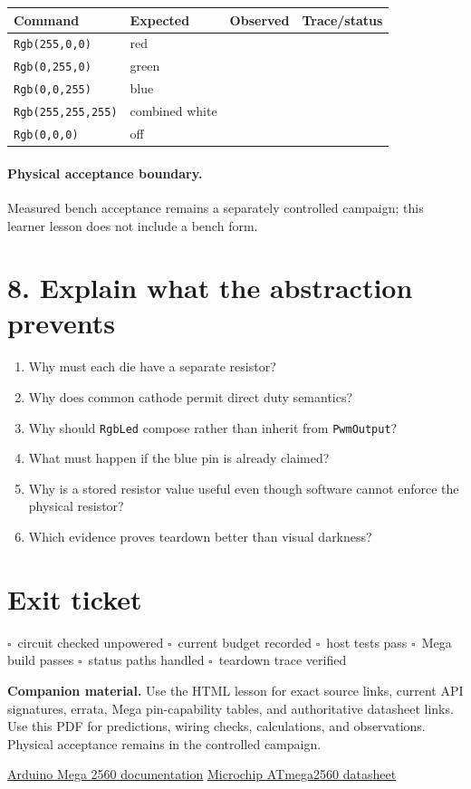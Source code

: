 \documentclass[11pt]{article}
\newcommand{\checkbox}{\(\square\)}
\begin{document}
\begin{center}
\begin{tabularx}{\linewidth}{@{}lXXX@{}}
\toprule
Command & Expected & Observed & Trace/status\\
\midrule
\texttt{Rgb(255,0,0)}   & red   & &\\
\texttt{Rgb(0,255,0)}   & green & &\\
\texttt{Rgb(0,0,255)}   & blue  & &\\
\texttt{Rgb(255,255,255)} & combined white & &\\
\texttt{Rgb(0,0,0)}     & off & &\\
\bottomrule
\end{tabularx}
\end{center}

\paragraph{Physical acceptance boundary.}
Measured bench acceptance remains a separately controlled campaign; this
learner lesson does not include a bench form.
\section*{8. Explain what the abstraction prevents}

\begin{enumerate}
    \item Why must each die have a separate resistor?
    \item Why does common cathode permit direct duty semantics?
    \item Why should \texttt{RgbLed} compose rather than inherit from
          \texttt{PwmOutput}?
    \item What must happen if the blue pin is already claimed?
    \item Why is a stored resistor value useful even though software cannot
          enforce the physical resistor?
    \item Which evidence proves teardown better than visual darkness?
\end{enumerate}

\section*{Exit ticket}

\checkbox\ circuit checked unpowered \quad
\checkbox\ current budget recorded \quad
\checkbox\ host tests pass \quad
\checkbox\ Mega build passes \quad
\checkbox\ status paths handled \quad
\checkbox\ teardown trace verified

\vfill
\small
\textbf{Companion material.}
Use the HTML lesson for exact source links, current API signatures, errata,
Mega pin-capability tables, and authoritative datasheet links. Use this PDF
for predictions, wiring checks, calculations, and observations. Physical
acceptance remains in the controlled campaign.

\href{https://docs.arduino.cc/hardware/mega-2560/}
{Arduino Mega 2560 documentation}\quad
\href{https://www.microchip.com/en-us/product/ATmega2560}
{Microchip ATmega2560 datasheet}
\end{document}
